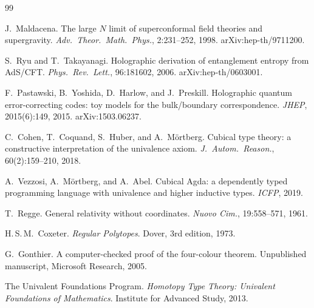 \documentclass[11pt, a4paper]{article}
\theoremstyle{plain}
\theoremstyle{definition}
\begin{document}
\begin{thebibliography}{99}

J.~Maldacena.
\newblock The large $N$ limit of superconformal field theories and
  supergravity.
\newblock \emph{Adv.\ Theor.\ Math.\ Phys.}, 2:231--252, 1998.
\newblock arXiv:hep-th/9711200.

S.~Ryu and T.~Takayanagi.
\newblock Holographic derivation of entanglement entropy from
  AdS/CFT.
\newblock \emph{Phys.\ Rev.\ Lett.}, 96:181602, 2006.
\newblock arXiv:hep-th/0603001.

F.~Pastawski, B.~Yoshida, D.~Harlow, and J.~Preskill.
\newblock Holographic quantum error-correcting codes: toy models
  for the bulk/boundary correspondence.
\newblock \emph{JHEP}, 2015(6):149, 2015.
\newblock arXiv:1503.06237.

C.~Cohen, T.~Coquand, S.~Huber, and A.~M\"ortberg.
\newblock Cubical type theory: a constructive interpretation of
  the univalence axiom.
\newblock \emph{J.\ Autom.\ Reason.}, 60(2):159--210, 2018.

A.~Vezzosi, A.~M\"ortberg, and A.~Abel.
\newblock Cubical Agda: a dependently typed programming language
  with univalence and higher inductive types.
\newblock \emph{ICFP}, 2019.

T.~Regge.
\newblock General relativity without coordinates.
\newblock \emph{Nuovo Cim.}, 19:558--571, 1961.

H.\,S.\,M.~Coxeter.
\newblock \emph{Regular Polytopes}.
\newblock Dover, 3rd edition, 1973.

G.~Gonthier.
\newblock A computer-checked proof of the four-colour theorem.
\newblock Unpublished manuscript, Microsoft Research, 2005.

The Univalent Foundations Program.
\newblock \emph{Homotopy Type Theory: Univalent Foundations of
  Mathematics}.
\newblock Institute for Advanced Study, 2013.

\end{thebibliography}
\end{document}
